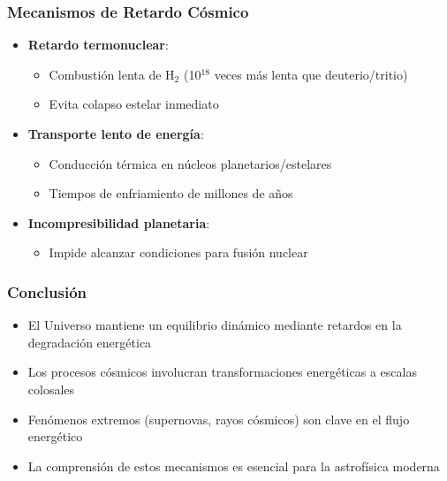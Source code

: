 \documentclass[main.tex]{subfiles}
\begin{document}
\begin{frame}
\frametitle{Mecanismos de Retardo Cósmico}
\begin{itemize}
    \item \textbf{Retardo termonuclear}: 
    \begin{itemize}
        \item Combustión lenta de H$_2$  (10$^{18}$ veces más lenta que deuterio/tritio)
        \item Evita colapso estelar inmediato
    \end{itemize}
    
    \item \textbf{Transporte lento de energía}: 
    \begin{itemize}
        \item Conducción térmica en núcleos planetarios/estelares
        \item Tiempos de enfriamiento de millones de años
    \end{itemize}
    
    \item \textbf{Incompresibilidad planetaria}: 
    \begin{itemize}
        \item Impide alcanzar condiciones para fusión nuclear
    \end{itemize}
\end{itemize}
\end{frame}

\begin{frame}
\frametitle{Conclusión}
\begin{itemize}
    \item El Universo mantiene un equilibrio dinámico mediante retardos en la degradación energética
    \item Los procesos cósmicos involucran transformaciones energéticas a escalas colosales
    \item Fenómenos extremos (supernovas, rayos cósmicos) son clave en el flujo energético
    \item La comprensión de estos mecanismos es esencial para la astrofísica moderna
\end{itemize}
\end{frame}
\end{document}

